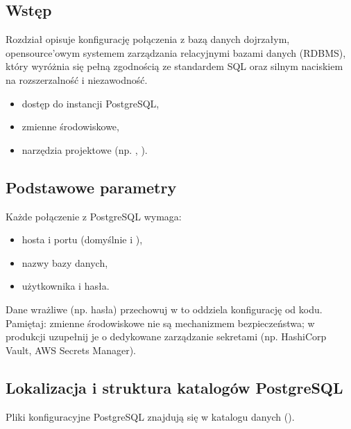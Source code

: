 \documentclass[letterpaper,10pt,english]{sphinxmanual}
\begin{document}
\subsection{Wstęp}
\label{\detokenize{rozdzial_2/rozdzial_22/index:wstep}}
\sphinxAtStartPar
Rozdział opisuje konfigurację połączenia z bazą danych  \textendash{} dojrzałym, open\sphinxhyphen{}source’owym systemem zarządzania relacyjnymi bazami danych (RDBMS), który wyróżnia się pełną zgodnością ze standardem SQL oraz silnym naciskiem na rozszerzalność i niezawodność.

\sphinxAtStartPar
{}
\begin{itemize}
\item {} 
\sphinxAtStartPar
dostęp do instancji PostgreSQL,

\item {} 
\sphinxAtStartPar
zmienne środowiskowe,

\item {} 
\sphinxAtStartPar
narzędzia projektowe (np. , ).

\end{itemize}


\subsection{Podstawowe parametry}
\label{\detokenize{rozdzial_2/rozdzial_22/index:podstawowe-parametry}}
\sphinxAtStartPar
Każde połączenie z PostgreSQL wymaga:
\begin{itemize}
\item {} 
\sphinxAtStartPar
hosta i portu (domyślnie  i ),

\item {} 
\sphinxAtStartPar
nazwy bazy danych,

\item {} 
\sphinxAtStartPar
użytkownika i hasła.

\end{itemize}

\sphinxAtStartPar
Dane wrażliwe (np. hasła) przechowuj w  \textendash{} to oddziela konfigurację od kodu.
Pamiętaj: zmienne środowiskowe nie są mechanizmem bezpieczeństwa; w produkcji uzupełnij je o dedykowane
zarządzanie sekretami (np. HashiCorp Vault, AWS Secrets Manager).


\subsection{Lokalizacja i struktura katalogów PostgreSQL}
\label{\detokenize{rozdzial_2/rozdzial_22/index:lokalizacja-i-struktura-katalogow-postgresql}}
\sphinxAtStartPar
Pliki konfiguracyjne PostgreSQL znajdują się w katalogu danych ().
\end{document}
